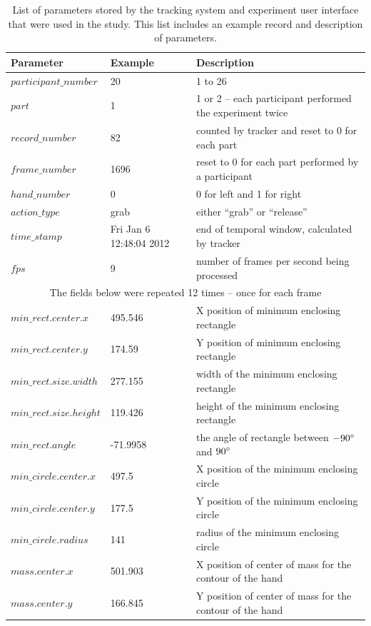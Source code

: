 \begin{center}
\begin{table}
\centering
\label{table:data_parameters}
\caption{List of parameters stored by the tracking system and experiment user interface that were used in the study. 
This list includes an example record and description of parameters.}
\begin{tabular}{|l p{2cm} p{9cm}|}
\hline
Parameter & Example & Description \\
\hline
$participant\_number$ & 20 & 1 to 26 \\
$part$ & 1 & 1 or 2 -- each participant performed the experiment twice \\
$record\_number$ & 82 & counted by tracker and reset to 0 for each part \\
$frame\_number$ & 1696 & reset to 0 for each part performed by a participant \\
$hand\_number$ & 0 & 0 for left and 1 for right\\
$action\_type$ & grab & either ``grab'' or ``release''\\
$time\_stamp$ & Fri Jan  6 12:48:04 2012 & end of temporal window, calculated by tracker\\
$fps$ & 9 & number of frames per second being processed\\
\hline
\multicolumn{3}{|c|}{The fields below were repeated 12 times -- once for each frame}\\
\hline
$min\_rect.center.x$ & 495.546 & X position of minimum enclosing rectangle\\
$min\_rect.center.y$ & 174.59 & Y position of minimum enclosing rectangle\\
$min\_rect.size.width$ & 277.155 & width of the minimum enclosing rectangle\\
$min\_rect.size.height$ & 119.426 & height of the minimum enclosing rectangle\\
$min\_rect.angle$ & -71.9958 & the angle of rectangle between $-90\degree$ and
$90\degree$\\
$min\_circle.center.x$ & 497.5 & X position of the minimum enclosing circle\\
$min\_circle.center.y$ & 177.5 & Y position of the minimum enclosing circle\\
$min\_circle.radius$ & 141 & radius of the minimum enclosing circle\\
$mass.center.x$ & 501.903 & X position of center of mass for the contour of the hand\\
$mass.center.y$ & 166.845 & Y position of center of mass for the contour of the hand\\

\end{tabular}
\end{table}
\end{center}
